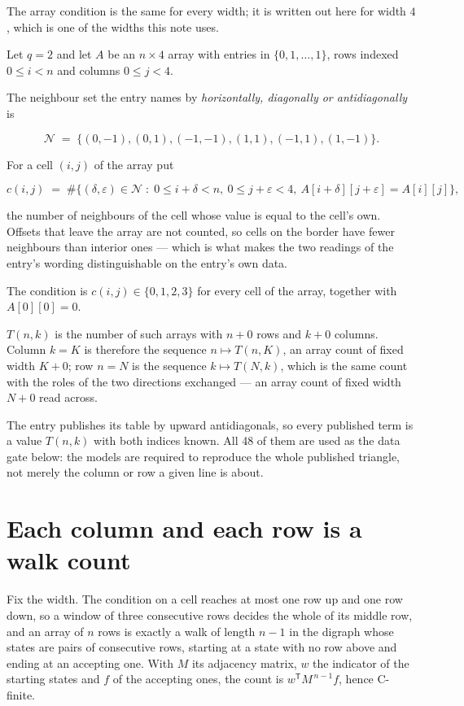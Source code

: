 \documentclass[11pt]{article}
\theoremstyle{definition}
\begin{document}
The array condition is the same for every width; it is written out here for width $4$, which is one of the widths this note uses.

Let $q = 2$ and let $A$ be an $n \times 4$ array with entries in $\{0,1,\dots,1\}$, rows indexed $0 \le i < n$ and columns $0 \le j < 4$.

The neighbour set the entry names by {\itshape horizontally, diagonally or antidiagonally} is

\[\mathcal{N} \;=\; \{(0,-1), (0,1), (-1,-1), (1,1), (-1,1), (1,-1)\}.\]

For a cell $(i,j)$ of the array put

\[c(i,j) \;=\; \#\bigl\{(\delta,\varepsilon)\in\mathcal{N} \;:\; 0\le i+\delta<n,\ 0\le j+\varepsilon<4,\ A[i+\delta][j+\varepsilon] = A[i][j]\bigr\},\]

the number of neighbours of the cell whose value is equal to the cell's own. Offsets that leave the array are not counted, so cells on the border have fewer neighbours than interior ones --- which is what makes the two readings of the entry's wording distinguishable on the entry's own data.

The condition is $c(i,j) \in \{0, 1, 2, 3\}$ for every cell of the array, together with $A[0][0]=0$.

$T(n,k)$ is the number of such arrays with $n + 0$ rows and $k + 0$ columns. Column $k = K$ is therefore the sequence $n \mapsto T(n,K)$, an array count of fixed width $K + 0$; row $n = N$ is the sequence $k \mapsto T(N,k)$, which is the same count with the roles of the two directions exchanged --- an array count of fixed width $N + 0$ read across.

The entry publishes its table by upward antidiagonals, so every published term is a value $T(n,k)$ with both indices known. All 48 of them are used as the data gate below: the models are required to reproduce the whole published triangle, not merely the column or row a given line is about.

\section{Each column and each row is a walk count}

Fix the width. The condition on a cell reaches at most one row up and one row down, so a window of three consecutive rows decides the whole of its middle row, and an array of $n$ rows is exactly a walk of length $n-1$ in the digraph whose states are pairs of consecutive rows, starting at a state with no row above and ending at an accepting one. With $M$ its adjacency matrix, $w$ the indicator of the starting states and $f$ of the accepting ones, the count is $w^{\mathsf T}M^{\,n-1}f$, hence C-finite.
\end{document}
